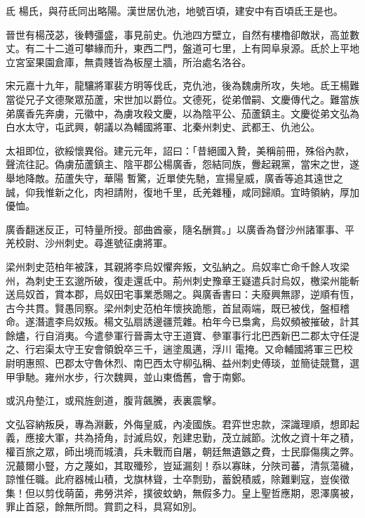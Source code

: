 \begin{pinyinscope}
 氐
 楊氏，與苻氐同出略陽。漢世居仇池，地號百頃，建安中有百頃氐王是也。



 晉世有楊茂苾，後轉彊盛，事見前史。仇池四方壁立，自然有樓櫓卻敵狀，高並數丈。有二十二道可攀緣而升，東西二門，盤道可七里，上有岡阜泉源。氐於上平地立宮室果園倉庫，無貴賤皆為板屋土牆，所治處名洛谷。



 宋元嘉十九年，龍驤將軍裴方明等伐氐，克仇池，後為魏虜所攻，失地。氐王楊難當從兄子文德聚眾茄蘆，宋世加以爵位。文德死，從弟僧嗣、文慶傳代之。難當族弟廣香先奔虜，元徽中，為虜攻殺文慶，以為陰平公、茄蘆鎮主。文慶從弟文弘為白水太守，屯武興，朝議以為輔國將軍、北秦州刺史、武都王、仇池公。



 太祖即位，欲綏懷異俗。建元元年，詔曰：「昔絕國入贄，美稱前冊，殊俗內款，聲流往記。偽虜茄蘆鎮主、陰平郡公楊廣香，怨結同族，釁起親黨，當宋之世，遂舉地降敵。茄蘆失守，華陽
 暫驚，近單使先馳，宣揚皇威，廣香等追其遠世之誠，仰我惟新之化，肉袒請附，復地千里，氐羌雜種，咸同歸順。宜時領納，厚加優恤。



 廣香翻迷反正，可特量所授。部曲酋豪，隨名酬賞。」以廣香為督沙州諸軍事、平羌校尉、沙州刺史。尋進號征虜將軍。



 梁州刺史范柏年被誅，其親將李烏奴懼奔叛，文弘納之。烏奴率亡命千餘人攻梁州，為刺史王玄邈所破，復走還氐中。荊州刺史豫章王嶷遣兵討烏奴，檄梁州能斬送烏奴首，賞本郡，烏奴田宅事業悉賜之。與廣香書曰：夫廢興無謬，逆順有恆，古今共貫。賢愚同察。梁州刺史范柏年懷挾詭態，首鼠兩端，既已被伐，盤桓稽命。遂潛遣李烏奴叛。楊文弘扇誘邊疆荒雜。柏年今已梟禽，烏奴頻被摧破，計其餘燼，行自消夷。今遣參軍行晉壽太守王道寶、參軍事行北巴西新巴二郡太守任湜之、行宕渠太守王安會領銳卒三千，遄塗風邁，浮川
 電掩。又命輔國將軍三巴校尉明惠照、巴郡太守魯休烈、南巴西太守柳弘稱、益州刺史傅琰，並簡徒競鶩，選甲爭馳。雍州水步，行次魏興，並山東僑舊，會于南鄭。



 或汎舟墊江，或飛旌劍道，腹背飆騰，表裏震擊。



 文弘容納叛戾，專為淵藪，外侮皇威，內凌國族。君弈世忠款，深識理順，想即起義，應接大軍，共為掎角，討滅烏奴，剋建忠勤，茂立誠節。沈攸之資十年之積，權百旅之眾，師出境而城潰，兵未戰而自屠，朝廷無遺鏃之費，士民靡傷痍之弊。況蕞爾小豎，方之蔑如，其取殲殄，豈延漏刻！忝以寡昧，分陜司蕃，清氛蕩穢，諒惟任職。此府器械山積，戈旗林聳，士卒剽勁，蓄銳積威，除難剿寇，豈俟徵集！但以剪伐萌菌，弗勞洪斧，撲彼蚊蚋，無假多力。皇上聖哲應期，恩澤廣被，罪止首惡，餘無所問。賞罰之科，具寫如別。




\end{pinyinscope}
